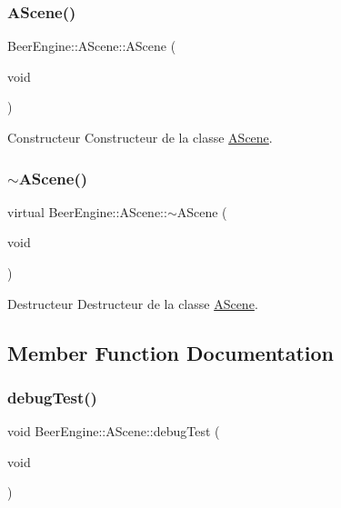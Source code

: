 \subsubsection{\texorpdfstring{A\+Scene()}{AScene()}}
{\footnotesize\ttfamily Beer\+Engine\+::\+A\+Scene\+::\+A\+Scene (\begin{DoxyParamCaption}\item[{void}]{ }\end{DoxyParamCaption})}



Constructeur Constructeur de la classe \mbox{\hyperlink{class_beer_engine_1_1_a_scene}{A\+Scene}}. 

\mbox{\label{class_beer_engine_1_1_a_scene_abaa7995756d22d36008d4b541b6b20ca}} 
\subsubsection{\texorpdfstring{$\sim$\+A\+Scene()}{~AScene()}}
{\footnotesize\ttfamily virtual Beer\+Engine\+::\+A\+Scene\+::$\sim$\+A\+Scene (\begin{DoxyParamCaption}\item[{void}]{ }\end{DoxyParamCaption})\hspace{0.3cm}{\ttfamily [virtual]}}



Destructeur Destructeur de la classe \mbox{\hyperlink{class_beer_engine_1_1_a_scene}{A\+Scene}}. 



\subsection{Member Function Documentation}
\mbox{\label{class_beer_engine_1_1_a_scene_a44f55dbd991eb07e425ca163f4773766}} 
\subsubsection{\texorpdfstring{debug\+Test()}{debugTest()}}
{\footnotesize\ttfamily void Beer\+Engine\+::\+A\+Scene\+::debug\+Test (\begin{DoxyParamCaption}\item[{void}]{ }\end{DoxyParamCaption})}

